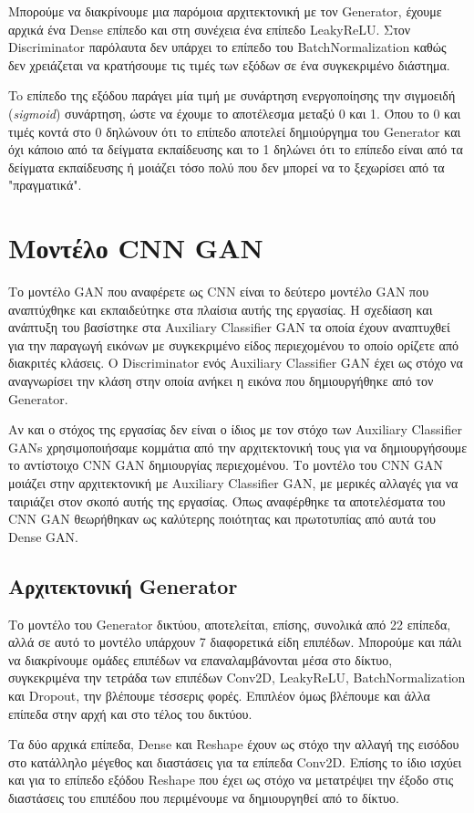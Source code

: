 \par
Μπορούμε να διακρίνουμε μια παρόμοια αρχιτεκτονική με τον Generator, έχουμε αρχικά ένα Dense επίπεδο και στη συνέχεια ένα επίπεδο LeakyReLU. Στον Discriminator παρόλαυτα δεν υπάρχει το επίπεδο του BatchNormalization καθώς δεν χρειάζεται να κρατήσουμε τις τιμές των εξόδων σε ένα συγκεκριμένο διάστημα.
\par
To επίπεδο της εξόδου παράγει μία τιμή με συνάρτηση ενεργοποίησης την σιγμοειδή (\textit{sigmoid}) συνάρτηση, ώστε να έχουμε το αποτέλεσμα μεταξύ 0 και 1. Όπου το 0 και τιμές κοντά στο 0 δηλώνουν ότι το επίπεδο αποτελεί δημιούργημα του Generator και όχι κάποιο από τα δείγματα εκπαίδευσης και το 1 δηλώνει ότι το επίπεδο είναι από τα δείγματα εκπαίδευσης ή μοιάζει τόσο πολύ που δεν μπορεί να το ξεχωρίσει από τα "πραγματικά".

\section{Μοντέλο CNN GAN}

Το μοντέλο GAN που αναφέρετε ως CNN είναι το δεύτερο μοντέλο GAN που αναπτύχθηκε και εκπαιδεύτηκε στα πλαίσια αυτής της εργασίας. Η σχεδίαση και ανάπτυξη του βασίστηκε στα Auxiliary Classifier GAN \cite{auxgan} τα οποία έχουν αναπτυχθεί για την παραγωγή εικόνων με συγκεκριμένο είδος περιεχομένου το οποίο ορίζετε από διακριτές κλάσεις. Ο Discriminator ενός Auxiliary Classifier GAN έχει ως στόχο να αναγνωρίσει την κλάση στην οποία ανήκει η εικόνα που δημιουργήθηκε από τον Generator. 
\par
Αν και ο στόχος της εργασίας δεν είναι ο ίδιος με τον στόχο των Auxiliary Classifier GANs χρησιμοποιήσαμε κομμάτια από την αρχιτεκτονική τους για να δημιουργήσουμε το αντίστοιχο CNN GAN δημιουργίας περιεχομένου. Το μοντέλο του CNN GAN μοιάζει στην αρχιτεκτονική με Auxiliary Classifier GAN, με μερικές αλλαγές για να ταιριάζει στον σκοπό αυτής της εργασίας. Όπως αναφέρθηκε τα αποτελέσματα του CNN GAN θεωρήθηκαν ως καλύτερης ποιότητας και πρωτοτυπίας από αυτά του Dense GAN.

\subsection{Αρχιτεκτονική Generator}
Το μοντέλο του Generator δικτύου, αποτελείται, επίσης, συνολικά από 22 επίπεδα, αλλά σε αυτό το μοντέλο υπάρχουν 7 διαφορετικά είδη επιπέδων. Μπορούμε και πάλι να διακρίνουμε ομάδες επιπέδων να επαναλαμβάνονται μέσα στο δίκτυο, συγκεκριμένα την τετράδα των επιπέδων  Conv2D, LeakyReLU, BatchNormalization και Dropout, την βλέπουμε τέσσερις φορές. Επιπλέον όμως βλέπουμε και άλλα επίπεδα στην αρχή και στο τέλος του δικτύου.
\par
Τα δύο αρχικά επίπεδα, Dense και Reshape έχουν ως στόχο την αλλαγή της εισόδου στο κατάλληλο μέγεθος και διαστάσεις για τα επίπεδα 
Conv2D. Επίσης το ίδιο ισχύει και για το επίπεδο εξόδου Reshape που έχει ως στόχο να μετατρέψει την έξοδο στις διαστάσεις του επιπέδου που περιμένουμε να δημιουργηθεί από το δίκτυο.
\par

